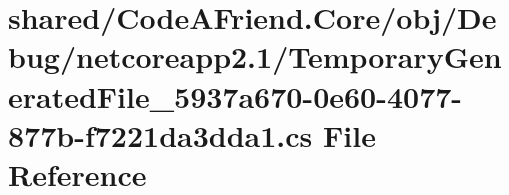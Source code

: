 \hypertarget{shared_2_code_a_friend_8_core_2obj_2_debug_2netcoreapp2_81_2_temporary_generated_file__5937a670-0e60-4077-877b-f7221da3dda1_8cs}{}\section{shared/\+Code\+A\+Friend.Core/obj/\+Debug/netcoreapp2.1/\+Temporary\+Generated\+File\+\_\+5937a670-\/0e60-\/4077-\/877b-\/f7221da3dda1.cs File Reference}
\label{shared_2_code_a_friend_8_core_2obj_2_debug_2netcoreapp2_81_2_temporary_generated_file__5937a670-0e60-4077-877b-f7221da3dda1_8cs}

